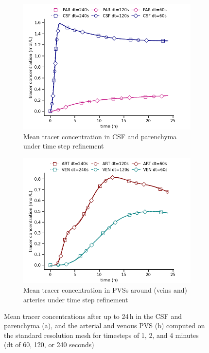 \documentclass[fleqn,10pt]{wlscirep}
\begin{document}
\begin{figure}
    \centering
    \begin{subfigure}[b]{0.45\textwidth}
        \centering
        \includegraphics[width = 1 \linewidth]{figures/time_refinement_par_csf_mean.png}
        \caption{Mean tracer concentration in CSF and parenchyma under time step refinement}
    \end{subfigure}
    \begin{subfigure}[b]{0.45\textwidth}
        \centering
     \includegraphics[width= 1\linewidth]{figures/time_refinement_art_ven_mean.png}
         \caption{Mean tracer concentration in PVSs around (veins and) arteries under time step refinement}
    \end{subfigure}
    \caption{Mean tracer concentrations after up to 24\,h in the CSF and parenchyma (a), and the arterial and venous PVS (b) computed on the standard resolution mesh for timesteps of 1, 2, and 4 minutes (dt of 60, 120, or 240 seconds)}
    \label{fig:time_convergence_concentrations}
\end{figure}
\end{document}
